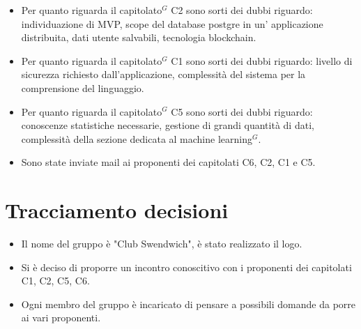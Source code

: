 \begin{itemize}
    \item Per quanto riguarda il capitolato$^{G}$ C2 sono sorti dei dubbi riguardo: individuazione di MVP, scope del database postgre in un' applicazione distribuita, dati utente salvabili, tecnologia blockchain.
    \item Per quanto riguarda il capitolato$^{G}$ C1 sono sorti dei dubbi riguardo: livello di sicurezza richiesto dall'applicazione, complessità del sistema per la comprensione del linguaggio.
    \item Per quanto riguarda il capitolato$^{G}$ C5 sono sorti dei dubbi riguardo: conoscenze statistiche necessarie, gestione di grandi quantità di dati, complessità della sezione dedicata al machine learning$^{G}$.
    \item Sono state inviate mail ai proponenti dei capitolati C6, C2, C1 e C5.
\end{itemize}
\section{Tracciamento decisioni}
\begin{itemize}
    \item Il nome del gruppo è "Club Swendwich", è stato realizzato il logo.
    \item Si è deciso di proporre un incontro conoscitivo con i proponenti dei capitolati C1, C2, C5, C6.
    \item Ogni membro del gruppo è incaricato di pensare a possibili domande da porre ai vari proponenti.
\end{itemize}